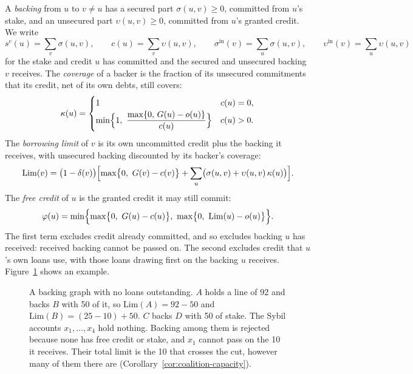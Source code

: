 \documentclass[acmsmall,nonacm,screen]{acmart}
\theoremstyle{acmdefinition}%
\newcommand{\Lim}{\mathrm{Lim}}
\newcommand{\sigin}{\sigma^{\mathrm{in}}}
\newcommand{\upsin}{\upsilon^{\mathrm{in}}}
\begin{document}
A \emph{backing} from $u$ to $v\neq u$ has a secured part $\sigma(u,v)\ge 0$, committed from $u$'s
stake, and an unsecured part $\upsilon(u,v)\ge0$, committed from $u$'s granted credit. We write
\[
  s^c(u)=\sum_{v}\sigma(u,v),\qquad c(u)=\sum_v \upsilon(u,v),\qquad
  \sigin(v)=\sum_u\sigma(u,v),\qquad \upsin(v)=\sum_u\upsilon(u,v)
\]
for the stake and credit $u$ has committed and the secured and unsecured backing $v$ receives. The
\emph{coverage} of a backer is the fraction of its unsecured commitments that its credit, net of its
own debts, still covers:
\begin{equation}\label{eq:coverage}
  \kappa(u)=\begin{cases}1 & c(u)=0,\\[2pt]
  \min\Bigl\{1,\ \dfrac{\max\{0,\,G(u)-o(u)\}}{c(u)}\Bigr\} & c(u)>0.\end{cases}
\end{equation}
The \emph{borrowing limit} of $v$ is its own uncommitted credit plus the backing it receives, with
unsecured backing discounted by its backer's coverage:
\begin{equation}\label{eq:limit}
  \Lim(v)=\bigl(1-\delta(v)\bigr)\Bigl[\max\bigl\{0,\ G(v)-c(v)\bigr\}+\sum_{u}\bigl(\sigma(u,v)+\upsilon(u,v)\,\kappa(u)\bigr)\Bigr].
\end{equation}
The \emph{free credit} of $u$ is the granted credit it may still commit:
\begin{equation}\label{eq:free}
  \varphi(u)=\min\Bigl\{\max\bigl\{0,\ G(u)-c(u)\bigr\},\ \max\bigl\{0,\ \Lim(u)-o(u)\bigr\}\Bigr\}.
\end{equation}
The first term excludes credit already committed, and so excludes backing $u$ has received:
received backing cannot be passed on. The second excludes credit that $u$'s own loans use, with
those loans drawing first on the backing $u$ receives. Figure~\ref{fig:graph} shows an example.

\begin{figure}[t]
  \centering
  
  \caption{A backing graph with no loans outstanding. $A$ holds a line of 92 and backs $B$ with 50
  of it, so $\Lim(A)=92-50$ and $\Lim(B)=(25-10)+50$. $C$ backs $D$ with 50 of stake. The Sybil
  accounts $x_1,\dots,x_4$ hold nothing. Backing among them is rejected because none has free credit
  or stake, and $x_1$ cannot pass on the 10 it receives. Their total limit is the 10 that crosses
  the cut, however many of them there are (Corollary~\ref{cor:coalition-capacity}).}
  \label{fig:graph}
\end{figure}
\end{document}
